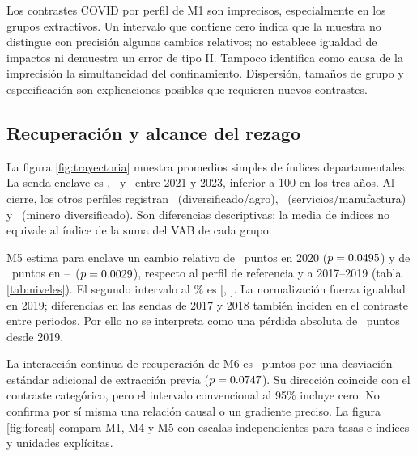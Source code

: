 Los contrastes COVID por perfil de M1 son imprecisos, especialmente en los grupos extractivos. Un intervalo que contiene cero indica que la muestra no distingue con precisión algunos cambios relativos; no establece igualdad de impactos ni demuestra un error de tipo II. Tampoco identifica como causa de la imprecisión la simultaneidad del confinamiento. Dispersión, tamaños de grupo y especificación son explicaciones posibles que requieren nuevos contrastes.

\begin{table}[htbp]\centering\footnotesize\setlength{\tabcolsep}{4pt}

\caption{Crecimiento anual del VAB real, M1--M4}\label{tab:tasas}
\end{table}
\FloatBarrier

\subsection{Recuperación y alcance del rezago}
La figura \ref{fig:trayectoria} muestra promedios simples de índices departamentales. La senda enclave es \EnclaveFirst, \EnclaveSecond\ y \EnclaveThird\ entre 2021 y 2023, inferior a 100 en los tres años. Al cierre, los otros perfiles registran \AgroFinal\ (diversificado/agro), \ServicesFinal\ (servicios/manufactura) y \MiningFinal\ (minero diversificado). Son diferencias descriptivas; la media de índices no equivale al índice de la suma del VAB de cada grupo.

M5 estima para enclave un cambio relativo de \CovidEnclaveBeta\ puntos en 2020 ($p=0.0495$) y de \ScarBeta\ puntos en \PostStart--\PostEnd\ ($p=0.0029$), respecto al perfil de referencia y a 2017--2019 (tabla \ref{tab:niveles}). El segundo intervalo al \ConfidencePct\% es [\ScarLow, \ScarHigh]. La normalización fuerza igualdad en 2019; diferencias en las sendas de 2017 y 2018 también inciden en el contraste entre periodos. Por ello no se interpreta como una pérdida absoluta de \ScarBeta\ puntos desde 2019.

La interacción continua de recuperación de M6 es \ContinuousBeta\ puntos por una desviación estándar adicional de extracción previa ($p=0.0747$). Su dirección coincide con el contraste categórico, pero el intervalo convencional al 95\% incluye cero. No confirma por sí misma una relación causal o un gradiente preciso. La figura \ref{fig:forest} compara M1, M4 y M5 con escalas independientes para tasas e índices y unidades explícitas.

